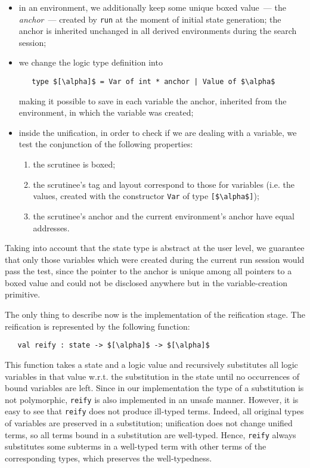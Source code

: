 \begin{itemize}
\item in an environment, we additionally keep some unique boxed value~--- the \emph{anchor}~--- created by \lstinline{run} at the moment of initial
state generation; the anchor is inherited unchanged in all derived environments during the search session;
\item we change the logic type definition into

\begin{lstlisting}
   type $[\alpha]$ = Var of int * anchor | Value of $\alpha$
\end{lstlisting}

\noindent making it possible to save in each variable the anchor, inherited from the environment, in which the variable was created;

\item inside the unification, in order to check if we are dealing with a variable, we test the conjunction of the following properties:

  \begin{enumerate}
    \item the scrutinee is boxed;
    \item the scrutinee's tag and layout correspond to those for variables (i.e. the values, created with the constructor \lstinline{Var} of
type \lstinline{[$\alpha$]});
    \item the scrutinee's anchor and the current environment's anchor have equal addresses.
  \end{enumerate}
\end{itemize}

Taking into account that the state type is abstract at the user level, we guarantee that only those variables which were
created during the current run session would pass the test, since the pointer to the anchor is unique among all pointers to a boxed value
and could not be disclosed anywhere but in the variable-creation primitive.

The only thing to describe now is the implementation of the reification stage. The reification is represented by the following
function:

\begin{lstlisting}
   val reify : state -> $[\alpha]$ -> $[\alpha]$
\end{lstlisting}

This function takes a state and a logic value and recursively substitutes all logic variables in that value w.r.t.
the substitution in the state until no occurrences of bound variables are left. Since in our implementation the type of a substitution is
not polymorphic, \lstinline{reify} is also implemented in an unsafe manner. However, it is easy to see that \lstinline{reify}
does not produce ill-typed terms. Indeed, all original types of variables are preserved in a substitution; unification does not
change unified terms, so all terms bound in a substitution are well-typed. Hence, \lstinline{reify} always substitutes
some subterms in a well-typed term with other terms of the corresponding types, which preserves the well-typedness.

